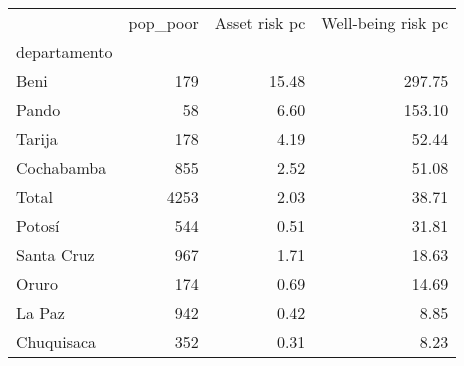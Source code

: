 \begin{tabular}{lrrr}
\toprule
{} &  pop\_poor &  Asset risk pc &  Well-being risk pc \\
departamento &           &                &                     \\
\midrule
Beni         &       179 &          15.48 &              297.75 \\
Pando        &        58 &           6.60 &              153.10 \\
Tarija       &       178 &           4.19 &               52.44 \\
Cochabamba   &       855 &           2.52 &               51.08 \\
Total        &      4253 &           2.03 &               38.71 \\
Potosí       &       544 &           0.51 &               31.81 \\
Santa Cruz   &       967 &           1.71 &               18.63 \\
Oruro        &       174 &           0.69 &               14.69 \\
La Paz       &       942 &           0.42 &                8.85 \\
Chuquisaca   &       352 &           0.31 &                8.23 \\
\bottomrule
\end{tabular}
